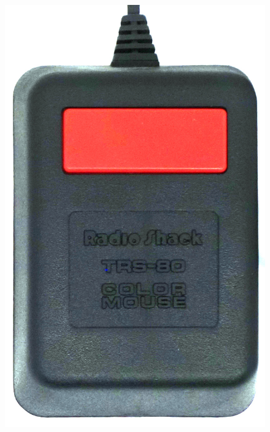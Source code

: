 \documentclass[11pt, a4paper]{article}
\begin{document}
\begin{figure}[h]
    \centering
    \includegraphics[scale=0.55]{1984_tandy_trs80_color_mouse/top_60.jpg}

\end{figure}
\end{document}
